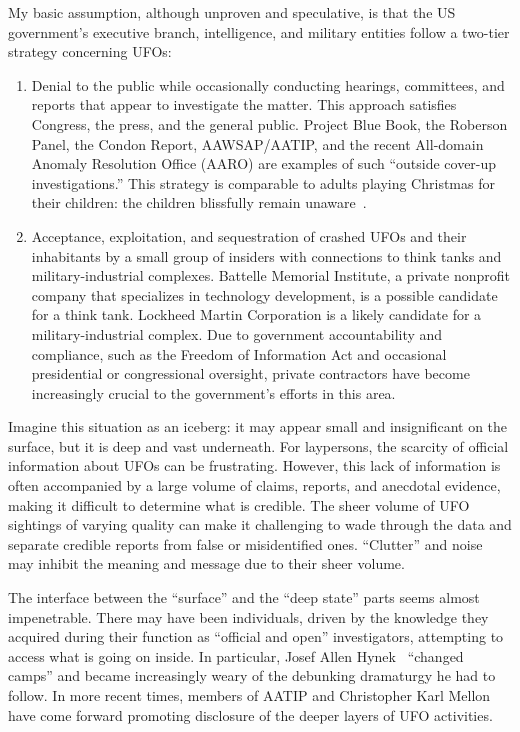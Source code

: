 My basic assumption, although unproven and speculative, is that the US government's executive branch, intelligence, and military entities follow a two-tier strategy concerning UFOs:
\begin{enumerate}
\item
Denial to the public while occasionally conducting hearings, committees, and reports that appear to investigate the matter. This approach satisfies Congress, the press, and the general public. Project Blue Book, the Roberson Panel, the Condon Report, AAWSAP/AATIP, and the recent All-domain Anomaly Resolution Office (AARO) are examples of such ``outside cover-up investigations.'' This strategy is comparable to adults playing Christmas for their children: the children blissfully remain unaware~\cite{Loewe-Christmas}.
\item
Acceptance, exploitation, and sequestration of crashed UFOs and their inhabitants by a small group of insiders with connections to think tanks and military-industrial complexes. Battelle Memorial Institute, a private nonprofit company that specializes in technology development, is a possible candidate for a think tank. Lockheed Martin Corporation is a likely candidate for a military-industrial complex. Due to government accountability and compliance, such as the Freedom of Information Act and occasional presidential or congressional oversight, private contractors have become increasingly crucial to the government's efforts in this area.
\end{enumerate}

Imagine this situation as an iceberg: it may appear small and insignificant on the surface, but it is deep and vast underneath. For laypersons, the scarcity of official information about UFOs can be frustrating. However, this lack of information is often accompanied by a large volume of claims, reports, and anecdotal evidence, making it difficult to determine what is credible. The sheer volume of UFO sightings of varying quality can make it challenging to wade through the data and separate credible reports from false or misidentified ones. ``Clutter'' and noise may inhibit the meaning and message due to their sheer volume.

The interface between the ``surface'' and the ``deep state'' parts seems almost impenetrable. There may have been individuals,
driven by the knowledge they acquired during their function as ``official and open'' investigators, attempting to access what is going on inside. In particular,
Josef Allen Hynek~\cite{Hynek:53,Hynek_1969,Hynek1972,Hynek1975Dec,Hynek1977Jan} ``changed camps''
and became increasingly weary of the debunking dramaturgy he had to follow. In more recent times, members of AATIP and
Christopher Karl Mellon~\cite{Mellon2018Mar,Mellon2022Dec}  have come forward promoting disclosure of the deeper layers of UFO activities.

